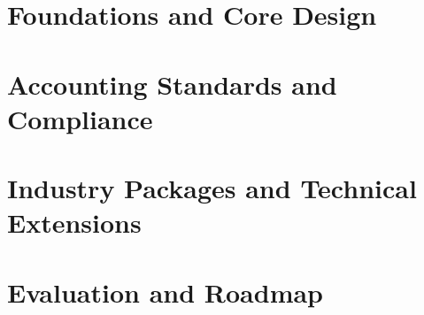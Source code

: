 \documentclass[11pt,a4paper]{report}
\begin{document}
\part{Foundations and Core Design}












\part{Accounting Standards and Compliance}




\part{Industry Packages and Technical Extensions}





\part{Evaluation and Roadmap}



\appendix






\begingroup\raggedright

\endgroup
\end{document}
